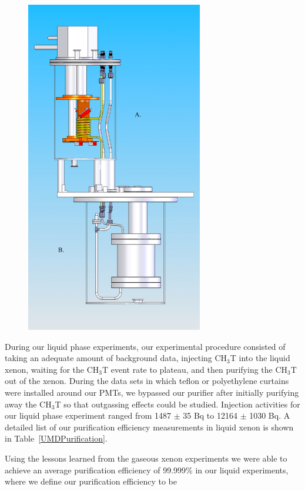 \begin{figure}
\includegraphics[scale=0.7]{UMDCryo.png} 
\label{UMDcryo}
\end{figure}


During our liquid phase experiments, our experimental procedure consisted of
taking an adequate amount of background data, injecting CH$_3$T into the liquid xenon, waiting for the CH$_3$T event rate to plateau, and then purifying the CH$_3$T
out of the xenon. During the data sets in which teflon or polyethylene curtains
were installed around our PMTs, we bypassed our purifier after initially purifying
away the CH$_3$T so that outgassing effects could be studied. Injection activities for our liquid phase experiment ranged from 1487 $\pm$ 35 Bq to 12164 $\pm$ 1030 Bq.
A detailed list of our purification efficiency measurements in liquid xenon is
shown in Table~\ref{UMDPurification}.  

Using the lessons learned from the gaseous xenon experiments we were able to achieve an average purification efficiency of 99.999\% in our liquid experiments, where we define our purification efficiency to be 

